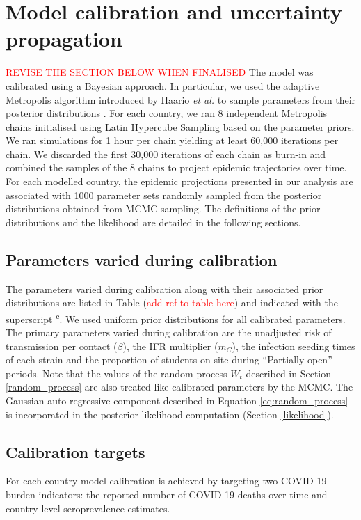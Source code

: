 \section{Model calibration and uncertainty propagation}
\label{calibration}
\textcolor{red}{REVISE THE SECTION BELOW WHEN FINALISED}
The model was calibrated using a Bayesian approach. In particular, we used the adaptive 
Metropolis algorithm introduced by Haario \textit{et al.} to sample parameters from their 
posterior distributions \cite{haario-2001}. For each country, we ran 8 independent Metropolis 
chains initialised using Latin Hypercube Sampling based on the parameter priors. 
We ran simulations for 1 hour per chain yielding at least 60,000 iterations per 
chain. We discarded the first 30,000 iterations of each chain as burn-in and combined the 
samples of the 8 chains to project epidemic trajectories over time. 
For each modelled country, the epidemic projections presented in our analysis are associated with 1000 parameter sets 
randomly sampled from the posterior distributions obtained from MCMC sampling. 
The definitions of the prior distributions and the likelihood are detailed in the following sections.

\subsection{Parameters varied during calibration}

The parameters varied during calibration along with their associated prior distributions 
are listed in Table (\textcolor{red}{add ref to table here}) and indicated with the superscript \textsuperscript{c}.
We used uniform prior distributions for all calibrated parameters. The primary parameters varied during calibration are 
the unadjusted risk of transmission per contact ($\beta$), the IFR multiplier ($m_C$), the infection seeding times of 
each strain and the proportion of students on-site during ``Partially open'' periods. Note that the values of the random 
process $W_t$ described in Section \ref{random_process} are also treated like calibrated parameters by the MCMC. The Gaussian 
auto-regressive component described in Equation \ref{eq:random_process} is incorporated in the posterior likelihood 
computation (Section \ref{likelihood}).

\subsection{Calibration targets}
\label{targets}
For each country model calibration is achieved by targeting two COVID-19 burden indicators: the 
reported number of COVID-19 deaths over time and country-level seroprevalence estimates. 

